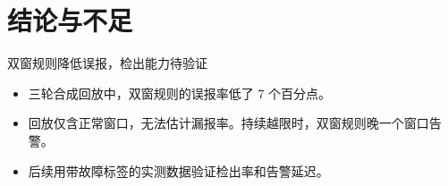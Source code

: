 \documentclass{sdjuslides}
\begin{document}
\section{结论与不足}
\begin{frame}{双窗规则降低误报，检出能力待验证}
  \begin{itemize}
    \item 三轮合成回放中，双窗规则的误报率低了 7 个百分点。
    \item 回放仅含正常窗口，无法估计漏报率。持续越限时，双窗规则晚一个窗口告警。
    \item 后续用带故障标签的实测数据验证检出率和告警延迟。
  \end{itemize}
\end{frame}

\end{document}
